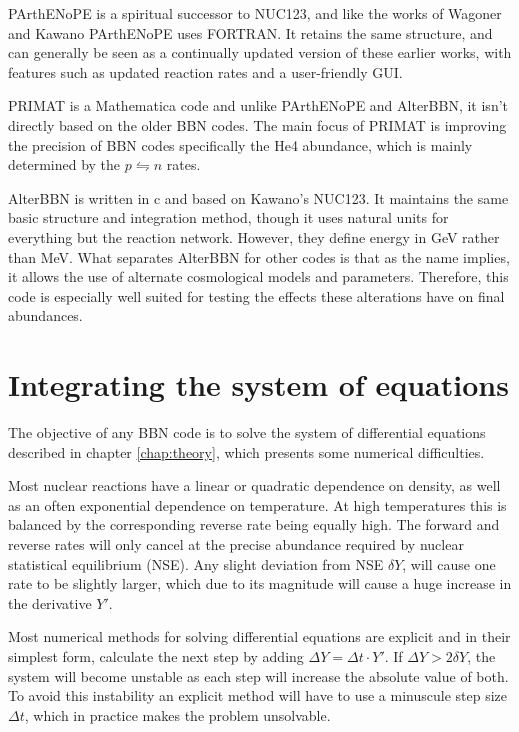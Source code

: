 PArthENoPE\cite{PArthENoPE} is a spiritual successor to NUC123, and like the works of Wagoner and Kawano PArthENoPE uses FORTRAN. It retains the same structure, and can generally be seen as a continually updated version of these earlier works, with features such as updated reaction rates and a user-friendly GUI.

PRIMAT\cite{PRIMAT} is a Mathematica code and unlike PArthENoPE and AlterBBN, it isn't directly based on the older BBN codes. The main focus of PRIMAT is improving the precision of BBN codes specifically the He4 abundance, which is mainly determined by the $p\leftrightharpoons n$ rates. 

AlterBBN is written in c and based on Kawano's NUC123. It maintains the same basic structure and integration method, though it uses natural units for everything but the reaction network. However, they define energy in GeV rather than MeV. What separates AlterBBN for other codes is that as the name implies, it allows the use of alternate cosmological models and parameters. Therefore, this code is especially well suited for testing the effects these alterations have on final abundances.


\section{Integrating the system of equations}
\label{sec:Solving}

The objective of any BBN code is to solve the system of differential equations described in chapter \ref{chap:theory}, which presents some numerical difficulties. 

Most nuclear reactions have a linear or quadratic dependence on density, as well as an often exponential dependence on temperature. At high temperatures this is balanced by the corresponding reverse rate being equally high. The forward and reverse rates will only cancel at the precise abundance required by nuclear statistical equilibrium (NSE). Any slight deviation from NSE $\delta Y$, will cause one rate to be slightly larger, which due to its magnitude will cause a huge increase in the derivative $Y'$.

Most numerical methods for solving differential equations are explicit and in their simplest form, calculate the next step by adding  $\Delta Y = \Delta t \cdot Y' $. 
If $\Delta Y>2\delta Y$, the system will become unstable as each step will increase the absolute value of both. To avoid this instability an explicit method will have to use a minuscule step size $\Delta t$, which in practice makes the problem unsolvable. 

